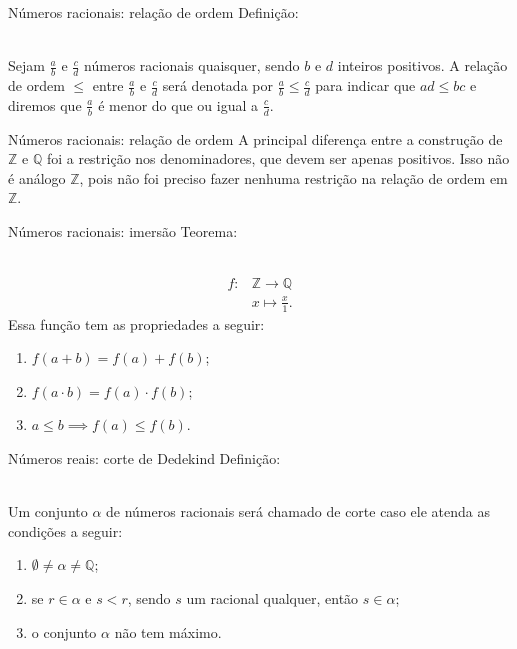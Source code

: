 \documentclass[xcolor=dvipsnames]{beamer}
\begin{document}
\begin{frame}{Números racionais: relação de ordem}
    Definição: \\~\
    
    Sejam $\frac{a}{b}$ e $\frac{c}{d}$ números racionais quaisquer, sendo $b$ e $d$ inteiros positivos. A relação de ordem $\leq$ entre $\frac{a}{b}$ e $\frac{c}{d}$ será denotada por $\frac{a}{b} \leq \frac{c}{d}$ para indicar que $ad \leq bc$ e diremos que $\frac{a}{b}$ é menor do que ou igual a $\frac{c}{d}$.
\end{frame}
\begin{frame}{Números racionais: relação de ordem}
    A principal diferença entre a construção de $\mathbb{Z}$ e $\mathbb{Q}$ foi a restrição nos denominadores, que devem ser apenas positivos. Isso não é análogo $\mathbb{Z}$, pois não foi preciso fazer nenhuma restrição na relação de ordem em $\mathbb{Z}$.
\end{frame}

\begin{frame}{Números racionais: imersão}
    Teorema: \\~\

    \begin{align*}
        f \colon &\mathbb{Z} \rightarrow \mathbb{Q} \\
            & x \mapsto \frac{x}{1}.
    \end{align*}
    Essa função tem as propriedades a seguir:
    \begin{enumerate}
        \item $f(a + b) = f(a) + f(b)$;
        \item $f(a \cdot b) = f(a) \cdot f(b)$;
        \item $a \leq b \implies f(a) \leq f(b)$.
    \end{enumerate}
\end{frame}

\begin{frame}{Números reais: corte de Dedekind}
    Definição: \\~\
    
    Um conjunto $\alpha$ de números racionais será chamado de corte caso ele atenda as condições a seguir:
    \begin{enumerate}
        \item $\emptyset \neq \alpha \neq \mathbb{Q}$;
        \item se $r \in \alpha$ e $s < r$, sendo $s$ um racional qualquer, então $s \in \alpha$;
        \item o conjunto $\alpha$ não tem máximo.
    \end{enumerate}
\end{frame}
\end{document}
